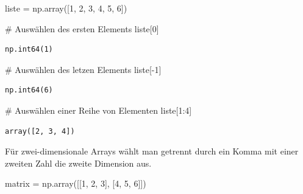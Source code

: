 \documentclass[
  letterpaper,
  DIV=11,
  numbers=noendperiod]{scrreprt}
\newenvironment{Shaded}{\begin{snugshade}}{\end{snugshade}}
\newcommand{\CommentTok}[1]{\textcolor[rgb]{0.37,0.37,0.37}{#1}}
\newcommand{\DecValTok}[1]{\textcolor[rgb]{0.68,0.00,0.00}{#1}}
\newcommand{\NormalTok}[1]{\textcolor[rgb]{0.00,0.23,0.31}{#1}}
\newcommand{\OperatorTok}[1]{\textcolor[rgb]{0.37,0.37,0.37}{#1}}
\begin{document}
\begin{Shaded}
\begin{Highlighting}[]
\NormalTok{liste }\OperatorTok{=}\NormalTok{ np.array([}\DecValTok{1}\NormalTok{, }\DecValTok{2}\NormalTok{, }\DecValTok{3}\NormalTok{, }\DecValTok{4}\NormalTok{, }\DecValTok{5}\NormalTok{, }\DecValTok{6}\NormalTok{])}
\end{Highlighting}
\end{Shaded}

\begin{Shaded}
\begin{Highlighting}[]
\CommentTok{\# Auswählen des ersten Elements}
\NormalTok{liste[}\DecValTok{0}\NormalTok{]}
\end{Highlighting}
\end{Shaded}

\begin{verbatim}
np.int64(1)
\end{verbatim}

\begin{Shaded}
\begin{Highlighting}[]
\CommentTok{\# Auswählen des letzen Elements}
\NormalTok{liste[}\OperatorTok{{-}}\DecValTok{1}\NormalTok{]}
\end{Highlighting}
\end{Shaded}

\begin{verbatim}
np.int64(6)
\end{verbatim}

\begin{Shaded}
\begin{Highlighting}[]
\CommentTok{\# Auswählen einer Reihe von Elementen}
\NormalTok{liste[}\DecValTok{1}\NormalTok{:}\DecValTok{4}\NormalTok{]}
\end{Highlighting}
\end{Shaded}

\begin{verbatim}
array([2, 3, 4])
\end{verbatim}

Für zwei-dimensionale Arrays wählt man getrennt durch ein Komma mit
einer zweiten Zahl die zweite Dimension aus.

\begin{Shaded}
\begin{Highlighting}[]
\NormalTok{matrix }\OperatorTok{=}\NormalTok{ np.array([[}\DecValTok{1}\NormalTok{, }\DecValTok{2}\NormalTok{, }\DecValTok{3}\NormalTok{], [}\DecValTok{4}\NormalTok{, }\DecValTok{5}\NormalTok{, }\DecValTok{6}\NormalTok{]])}
\end{Highlighting}
\end{Shaded}
\end{document}
